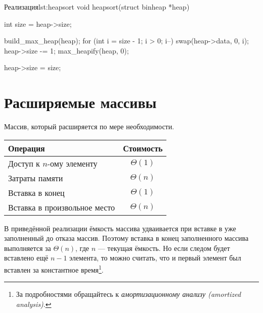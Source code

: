 \begin{clst}{Реализация}{lst:heapsort}
void heapsort(struct binheap *heap)
{
    int size = heap->size;

    build_max_heap(heap);
    for (int i = size - 1; i > 0; i--) {
        swap(heap->data, 0, i);
        heap->size -= 1;
        max_heapify(heap, 0);
    }

    heap->size = size;
}
\end{clst}

\section{Расширяемые массивы}
\label{sec:ext-arrays}

Массив, который расширяется по мере необходимости.
\begin{center}
  \begin{tabular}{lc}
    \toprule
    Операция & Стоимость \\
    \midrule
    Доступ к $n$-ому элементу & $\Theta(1)$ \\
    Затраты памяти & $\Theta(n)$ \\
    Вставка в конец & $\Theta(1)$ \\
    Вставка в произвольное место & $\Theta(n)$ \\
    \bottomrule
  \end{tabular}
\end{center}

В приведённой реализации ёмкость массива удваивается при вставке в уже заполненный до отказа массив. Поэтому вставка в конец заполненного массива выполняется за $\Theta(n)$, где $n$ — текущая ёмкость. Но если следом будет вставлено ещё $n - 1$ элемента, то можно считать, что и первый элемент был вставлен за константное время\footnote{За подробностями обращайтесь к \emph{амортизационному анализу (amortized analysis)}.}.

